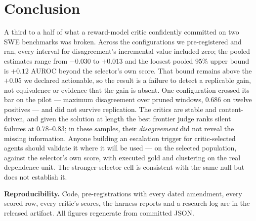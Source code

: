 \documentclass[10pt]{article}
\begin{document}
\section{Conclusion}
A third to a half of what a reward-model critic confidently committed on two SWE benchmarks was broken. Across the configurations we pre-registered and ran, every interval for disagreement's incremental value included zero; the pooled estimates range from $-0.030$ to $+0.013$ and the loosest pooled 95\% upper bound is $+0.12$ AUROC beyond the selector's own score. That bound remains above the $+0.05$ we declared actionable, so the result is a failure to detect a replicable gain, not equivalence or evidence that the gain is absent. One configuration crossed its bar on the pilot --- maximum disagreement over pruned windows, 0.686 on twelve positives --- and did not survive replication. The critics are stable and content-driven, and given the solution at length the best frontier judge ranks silent failures at 0.78--0.83; in these samples, their \emph{disagreement} did not reveal the missing information. Anyone building an escalation trigger for critic-selected agents should validate it where it will be used --- on the selected population, against the selector's own score, with executed gold and clustering on the real dependence unit. The stronger-selector cell is consistent with the same null but does not establish it.

{\small\textbf{Reproducibility.} Code, pre-registrations with every dated amendment, every scored row, every critic's scores, the harness reports and a research log are in the released artifact. All figures regenerate from committed JSON. }



\end{document}

